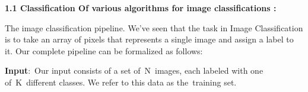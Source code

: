 \documentclass{article} %
\begin{document}
\noindent  

\noindent  

\noindent  

\noindent 

\noindent 

\noindent 

\noindent 

\noindent 

\noindent 

\noindent 

\noindent 

\noindent 

\noindent 

\noindent 

\noindent 

\noindent 

\noindent 

\noindent 

\noindent 

\noindent 

\noindent 

\noindent 

\noindent 

\noindent 

\noindent 

\noindent 

\noindent 

\noindent 

\noindent 

\noindent 

\noindent 

\noindent 

\noindent 

\noindent 

\noindent 

\noindent 

\noindent \textbf{}

\noindent \textbf{}

\noindent \textbf{1.1 Classification Of various algorithms for image classifications :}

\noindent \textbf{ }

\noindent The image classification pipeline. We've seen that the task in Image Classification is to take an array of pixels that represents a single image and assign a label to it. Our complete pipeline can be formalized as follows:

\noindent \textbf{Input}:~Our input consists of a set of~N~images, each labeled with one of~K~different classes. We refer to this data as the~training set.
\end{document}
